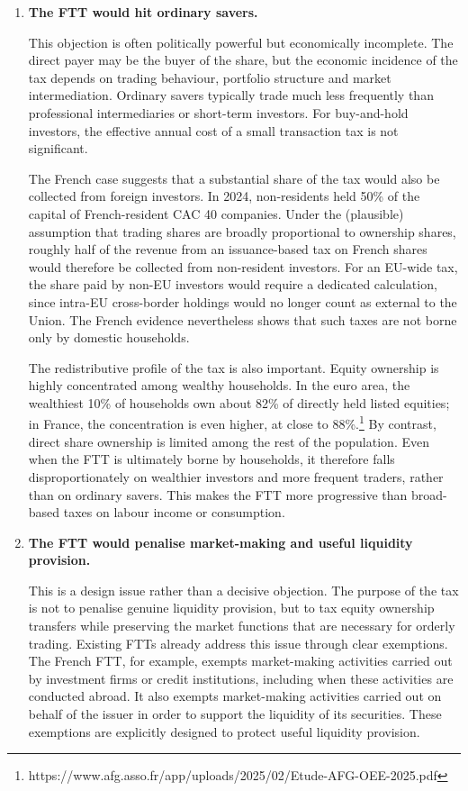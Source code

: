 \documentclass[../../main]{subfiles}
\begin{document}
\begin{enumerate}
    \item \textbf{The FTT would hit ordinary savers.}

    This objection is often politically powerful but economically incomplete. The direct payer may be the buyer of the share, but the economic incidence of the tax depends on trading behaviour, portfolio structure and market intermediation. Ordinary savers typically trade much less frequently than professional intermediaries or short-term investors. For buy-and-hold investors, the effective annual cost of a small transaction tax is not significant.

The French case suggests that a substantial share of the tax would also be collected from foreign investors. In 2024, non-residents held 50\% of the capital of French-resident CAC 40 companies. Under the (plausible) assumption that trading shares are broadly proportional to ownership shares, roughly half of the revenue from an issuance-based tax on French shares would therefore be collected from non-resident investors. For an EU-wide tax, the share paid by non-EU investors would require a dedicated calculation, since intra-EU cross-border holdings would no longer count as external to the Union. The French evidence nevertheless shows that such taxes are not borne only by domestic households.

The redistributive profile of the tax is also important. Equity ownership is highly concentrated among wealthy households. In the euro area, the wealthiest 10\% of households own about 82\% of directly held listed equities; in France, the concentration is even higher, at close to 88\%.\footnote{https://www.afg.asso.fr/app/uploads/2025/02/Etude-AFG-OEE-2025.pdf} By contrast, direct share ownership is limited among the rest of the population. Even when the FTT is ultimately borne by households, it therefore falls disproportionately on wealthier investors and more frequent traders, rather than on ordinary savers. This makes the FTT more progressive than broad-based taxes on labour income or consumption.

    \item \textbf{The FTT would penalise market-making and useful liquidity provision.}

   This is a design issue rather than a decisive objection. The purpose of the tax is not to penalise genuine liquidity provision, but to tax equity ownership transfers while preserving the market functions that are necessary for orderly trading. Existing FTTs already address this issue through clear exemptions. The French FTT, for example, exempts market-making activities carried out by investment firms or credit institutions, including when these activities are conducted abroad. It also exempts market-making activities carried out on behalf of the issuer in order to support the liquidity of its securities. These exemptions are explicitly designed to protect useful liquidity provision.


\end{enumerate}
\end{document}

